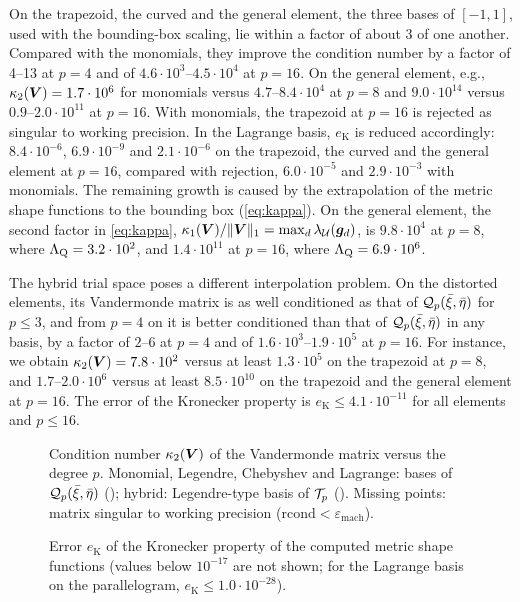 On the trapezoid, the curved and the general element, the three bases of $[-1,1]$, used with the bounding-box scaling, lie within a factor of about 3 of one another. Compared with the monomials, they improve the condition number by a factor of 4--13 at $p=4$ and of $4.6\cdot10^{3}$--$4.5\cdot10^{4}$ at $p=16$. On the general element, e.g., $\kappa_2(\bm{V})=1.7\cdot10^{6}$ for monomials versus $4.7$--$8.4\cdot10^{4}$ at $p=8$ and $9.0\cdot10^{14}$ versus $0.9$--$2.0\cdot10^{11}$ at $p=16$. With monomials, the trapezoid at $p=16$ is rejected as singular to working precision. In the Lagrange basis, $e_{\mathrm{K}}$ is reduced accordingly: $8.4\cdot10^{-6}$, $6.9\cdot10^{-9}$ and $2.1\cdot10^{-6}$ on the trapezoid, the curved and the general element at $p=16$, compared with rejection, $6.0\cdot10^{-5}$ and $2.9\cdot10^{-3}$ with monomials. The remaining growth is caused by the extrapolation of the metric shape functions to the bounding box (\cref{eq:kappa}). On the general element, the second factor in \cref{eq:kappa}, $\kappa_1(\bm{V})/\|\bm{V}\|_1=\max_d\lambda_{\mathcal U}(\bm g_d)$, is $9.8\cdot10^{4}$ at $p=8$, where $\Lambda_{\mathrm{Q}}=3.2\cdot10^{2}$, and $1.4\cdot10^{11}$ at $p=16$, where $\Lambda_{\mathrm{Q}}=6.9\cdot10^{6}$.

The hybrid trial space poses a different interpolation problem. On the distorted elements, its Vandermonde matrix is as well conditioned as that of $\mathcal Q_p(\bar\xi,\bar\eta)$ for $p\le3$, and from $p=4$ on it is better conditioned than that of $\mathcal Q_p(\bar\xi,\bar\eta)$ in any basis, by a factor of $2$--$6$ at $p=4$ and of $1.6\cdot10^{3}$--$1.9\cdot10^{5}$ at $p=16$. For instance, we obtain $\kappa_2(\bm{V})=7.8\cdot10^{2}$ versus at least $1.3\cdot10^{5}$ on the trapezoid at $p=8$, and $1.7$--$2.0\cdot10^{6}$ versus at least $8.5\cdot10^{10}$ on the trapezoid and the general element at $p=16$. The error of the Kronecker property is $e_{\mathrm{K}}\le4.1\cdot10^{-11}$ for all elements and $p\le16$.

\begin{figure}[htbp]
  \centering
  
  \caption{Condition number $\kappa_2(\bm{V})$ of the Vandermonde matrix versus the degree $p$. Monomial, Legendre, Chebyshev and Lagrange: bases of $\mathcal Q_p(\bar\xi,\bar\eta)$ (\PM); hybrid: Legendre-type basis of $\mathcal T_p$ (\PH). Missing points: matrix singular to working precision ($\mathrm{rcond}<\varepsilon_{\mathrm{mach}}$).}
  \label{fig:kappa}
\end{figure}

\begin{figure}[htbp]
  \centering
  
  \caption{Error $e_{\mathrm{K}}$ of the Kronecker property of the computed metric shape functions (values below $10^{-17}$ are not shown; for the Lagrange basis on the parallelogram, $e_{\mathrm{K}}\le1.0\cdot10^{-28}$).}
  \label{fig:kron}
\end{figure}

